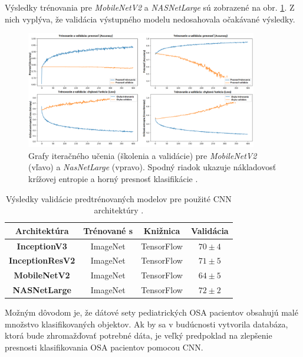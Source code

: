 Výsledky trénovania pre \textit{MobileNetV2} a \textit{NASNetLarge} sú zobrazené na obr. \ref{fig:resers:d}. Z nich vyplýva, že validácia výstupného modelu nedosahovala očakávané výsledky. 


\begin{figure}[h]
	\centering
	\includegraphics[width=0.9\textwidth]{figures/resers_d.png}
	\caption{Grafy iteračného učenia (školenia a validácie) pre \textit{MobileNetV2} (vľavo) a \textit{NasNetLarge} (vpravo). Spodný riadok ukazuje nákladovosť krížovej entropie a horný presnosť klasifikácie \cite{Kiaee2019DiagnosisOP}.}
	\label{fig:resers:d}
\end{figure}


\begin{table}[H]
	\caption{\label{tab:resers:1} Výsledky validácie predtrénovaných modelov pre použité CNN architektúry \cite{Kiaee2019DiagnosisOP}. }
	\centering
	\begin{tabular}{cccc}
		\toprule
		\textbf{Architektúra} & \textbf{Trénované s} & \textbf{Knižnica} & \textbf{Validácia}     \\ 
		\midrule
		\textbf{InceptionV3}           & ImageNet     	& TensorFlow    & $70 \pm 4$		\\ 
		\textbf{InceptionResV2}        & ImageNet		& TensorFlow  	& $71 \pm 5$		\\ 
		\textbf{MobileNetV2}           & ImageNet     	& TensorFlow    & $64 \pm 5$		\\ 
		\textbf{NASNetLarge}           & ImageNet     	& TensorFlow    & $72 \pm 2$		\\ 
		\bottomrule
	\end{tabular}
\end{table}

Možným dôvodom je, že dátové sety pediatrických OSA pacientov obsahujú malé množstvo klasifikovaných objektov. Ak by sa v budúcnosti vytvorila databáza, ktorá bude zhromažďovať potrebné dáta, je veľký predpoklad na zlepšenie presnosti klasifikovania OSA pacientov pomocou CNN.


